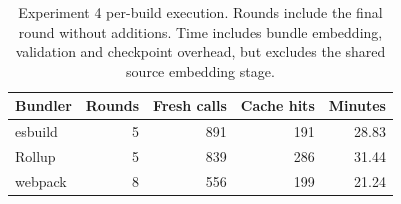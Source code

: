 \begin{table}[htbp]
\caption{Experiment 4 per-build execution. Rounds include the final round without additions. Time includes bundle embedding, validation and checkpoint overhead, but excludes the shared source embedding stage.}
\label{tab:exp4-runtime}
\centering\small
\begin{tabular}{lrrrr}
\toprule
Bundler & Rounds & Fresh calls & Cache hits & Minutes\\
\midrule
esbuild & 5 & 891 & 191 & 28.83\\
Rollup & 5 & 839 & 286 & 31.44\\
webpack & 8 & 556 & 199 & 21.24\\
\bottomrule
\end{tabular}
\end{table}

